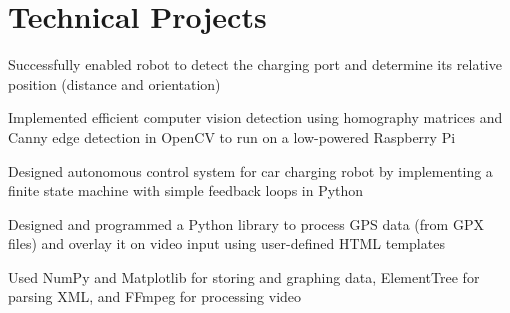 \begin{minipage}[t]{0.66\textwidth}


 \section{Technical Projects}

 \descript{ } %
 \begin{tightitemize}
  \item Successfully enabled robot to detect the charging port and determine its relative position (distance and orientation)
  \item Implemented efficient computer vision detection using homography matrices and Canny edge detection in OpenCV to run on a low-powered Raspberry Pi
  \item Designed autonomous control system for car charging robot by implementing a finite state machine with simple feedback loops in Python
 \end{tightitemize}

 \sectionspace %

 \descript{ } %
 \begin{tightitemize}
  \item Designed and programmed a Python library to process GPS data (from GPX files) and overlay it on video input using user-defined HTML templates
  \item Used NumPy and Matplotlib for storing and graphing data, ElementTree for parsing XML, and FFmpeg for processing video
 \end{tightitemize}


\end{minipage}
